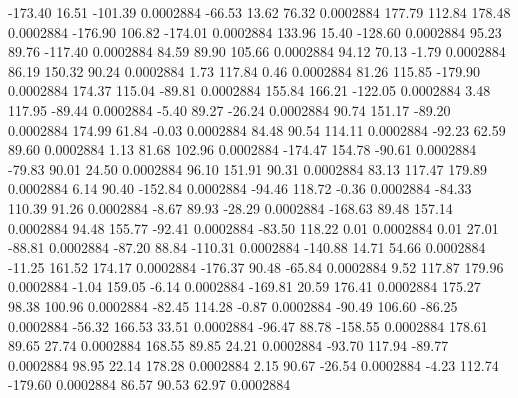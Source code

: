      -173.40       16.51     -101.39     0.0002884
      -66.53       13.62       76.32     0.0002884
      177.79      112.84      178.48     0.0002884
     -176.90      106.82     -174.01     0.0002884
      133.96       15.40     -128.60     0.0002884
       95.23       89.76     -117.40     0.0002884
       84.59       89.90      105.66     0.0002884
       94.12       70.13       -1.79     0.0002884
       86.19      150.32       90.24     0.0002884
        1.73      117.84        0.46     0.0002884
       81.26      115.85     -179.90     0.0002884
      174.37      115.04      -89.81     0.0002884
      155.84      166.21     -122.05     0.0002884
        3.48      117.95      -89.44     0.0002884
       -5.40       89.27      -26.24     0.0002884
       90.74      151.17      -89.20     0.0002884
      174.99       61.84       -0.03     0.0002884
       84.48       90.54      114.11     0.0002884
      -92.23       62.59       89.60     0.0002884
        1.13       81.68      102.96     0.0002884
     -174.47      154.78      -90.61     0.0002884
      -79.83       90.01       24.50     0.0002884
       96.10      151.91       90.31     0.0002884
       83.13      117.47      179.89     0.0002884
        6.14       90.40     -152.84     0.0002884
      -94.46      118.72       -0.36     0.0002884
      -84.33      110.39       91.26     0.0002884
       -8.67       89.93      -28.29     0.0002884
     -168.63       89.48      157.14     0.0002884
       94.48      155.77      -92.41     0.0002884
      -83.50      118.22        0.01     0.0002884
        0.01       27.01      -88.81     0.0002884
      -87.20       88.84     -110.31     0.0002884
     -140.88       14.71       54.66     0.0002884
      -11.25      161.52      174.17     0.0002884
     -176.37       90.48      -65.84     0.0002884
        9.52      117.87      179.96     0.0002884
       -1.04      159.05       -6.14     0.0002884
     -169.81       20.59      176.41     0.0002884
      175.27       98.38      100.96     0.0002884
      -82.45      114.28       -0.87     0.0002884
      -90.49      106.60      -86.25     0.0002884
      -56.32      166.53       33.51     0.0002884
      -96.47       88.78     -158.55     0.0002884
      178.61       89.65       27.74     0.0002884
      168.55       89.85       24.21     0.0002884
      -93.70      117.94      -89.77     0.0002884
       98.95       22.14      178.28     0.0002884
        2.15       90.67      -26.54     0.0002884
       -4.23      112.74     -179.60     0.0002884
       86.57       90.53       62.97     0.0002884
